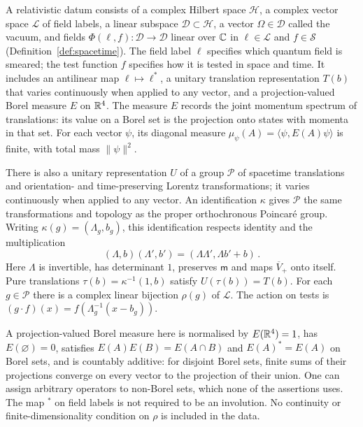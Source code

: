 \begin{definition}\label{def:relativistic}
A relativistic datum consists of a complex Hilbert space $\mathcal H$, a complex vector space $\mathcal L$ of field labels, a linear subspace $\mathcal D\subset\mathcal H$, a vector $\Omega\in\mathcal D$ called the vacuum, and fields $\Phi(\ell,f):\mathcal D\to\mathcal D$ linear over $\mathbb C$ in $\ell\in\mathcal L$ and $f\in\mathcal S$ (Definition~\ref{def:spacetime}).
The field label $\ell$ specifies which quantum field is smeared; the test function $f$ specifies how it is tested in space and time.
It includes an antilinear map $\ell\mapsto\ell^*$, a unitary translation representation $T(b)$ that varies continuously when applied to any vector, and a projection-valued Borel measure $E$ on $\mathbb R^4$.
The measure $E$ records the joint momentum spectrum of translations: its value on a Borel set is the projection onto states with momenta in that set.
For each vector $\psi$, its diagonal measure $\mu_\psi(A)=\langle\psi,E(A)\psi\rangle$ is finite, with total mass $\|\psi\|^2$.

There is also a unitary representation $U$ of a group $\mathcal P$ of spacetime translations and orientation- and time-preserving Lorentz transformations; it varies continuously when applied to any vector.
An identification $\kappa$ gives $\mathcal P$ the same transformations and topology as the proper orthochronous Poincar\'e group.
Writing $\kappa(g)=(\Lambda_g,b_g)$, this identification respects identity and the multiplication
\begin{equation}\label{eq:poincare}
(\Lambda,b)(\Lambda',b')=(\Lambda\Lambda',\Lambda b'+b)\,.
\end{equation}
Here $\Lambda$ is invertible, has determinant $1$, preserves $\mathsf m$ and maps $\overline V_+$ onto itself.
Pure translations $\tau(b)=\kappa^{-1}(1,b)$ satisfy $U(\tau(b))=T(b)$.
For each $g\in\mathcal P$ there is a complex linear bijection $\rho(g)$ of $\mathcal L$.
The action on tests is $(g\cdot f)(x)=f(\Lambda_g^{-1}(x-b_g))$.
\end{definition}

A projection-valued Borel measure here is normalised by $E(\mathbb R^4)=1$, has $E(\varnothing)=0$, satisfies $E(A)E(B)=E(A\cap B)$ and $E(A)^*=E(A)$ on Borel sets, and is countably additive: for disjoint Borel sets, finite sums of their projections converge on every vector to the projection of their union.
One can assign arbitrary operators to non-Borel sets, which none of the assertions uses.
The map ${}^*$ on field labels is not required to be an involution.
No continuity or finite-dimensionality condition on $\rho$ is included in the data.

